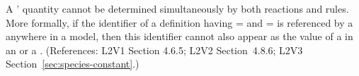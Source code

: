 A \Species' quantity cannot be determined simultaneously by both
reactions and rules.  More formally, if the identifier of a
\Species definition having =
and = is referenced by a
\SpeciesReference anywhere in a model, then this identifier cannot
also appear as the value of a  in an
\AssignmentRule or a \RateRule.  (References: L2V1 Section 4.6.5;
L2V2 Section~4.8.6; L2V3 Section~\ref{sec:species-constant}.)
